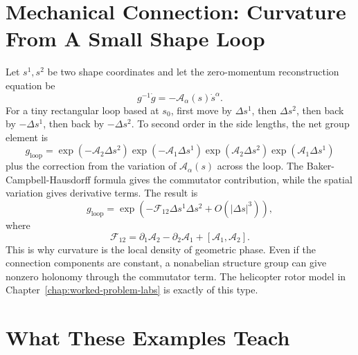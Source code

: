 \section{Mechanical Connection: Curvature From A Small Shape Loop}
\label{sec:detailed-connection-curvature}

Let \(s^1,s^2\) be two shape coordinates and let the zero-momentum
reconstruction equation be
\[
  g^{-1}\dot g
  =
  -\mathcal A_\alpha(s)\dot s^\alpha.
\]
For a tiny rectangular loop based at \(s_0\), first move by
\(\Delta s^1\), then \(\Delta s^2\), then back by \(-\Delta s^1\), then back
by \(-\Delta s^2\). To second order in the side lengths, the net group element
is
\[
  g_{\mathrm{loop}}
  =
  \exp(-\mathcal A_2\Delta s^2)
  \exp(-\mathcal A_1\Delta s^1)
  \exp(\mathcal A_2\Delta s^2)
  \exp(\mathcal A_1\Delta s^1)
\]
plus the correction from the variation of \(\mathcal A_\alpha(s)\) across the
loop. The Baker-Campbell-Hausdorff formula gives the commutator contribution,
while the spatial variation gives derivative terms. The result is
\[
  g_{\mathrm{loop}}
  =
  \exp\left(
    -\mathcal F_{12}\Delta s^1\Delta s^2
    +
    O(|\Delta s|^3)
  \right),
\]
where
\[
  \boxed{
  \mathcal F_{12}
  =
  \partial_1\mathcal A_2-\partial_2\mathcal A_1
  +
  [\mathcal A_1,\mathcal A_2].
  }
\]
This is why curvature is the local density of geometric phase. Even if the
connection components are constant, a nonabelian structure group can give
nonzero holonomy through the commutator term. The helicopter rotor model in
Chapter~\ref{chap:worked-problem-labs} is exactly of this type.

\section{What These Examples Teach}
\label{sec:detailed-examples-summary}

